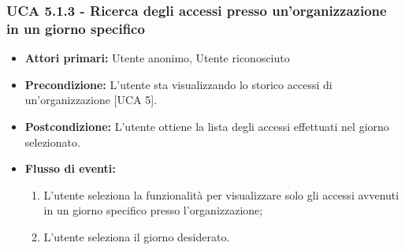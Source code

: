 \subsubsection{UCA 5.1.3 - Ricerca degli accessi presso un'organizzazione in un giorno specifico}
\begin{itemize}
	\item \textbf{Attori primari:} Utente anonimo, Utente riconosciuto
	\item \textbf{Precondizione:} L'utente sta visualizzando lo storico accessi di un'organizzazione [UCA 5].
	\item \textbf{Postcondizione:} L'utente ottiene la lista degli accessi effettuati nel giorno selezionato.
	\item \textbf{Flusso di eventi:}
	\begin{enumerate}
		\item L'utente seleziona la funzionalità per visualizzare solo gli accessi avvenuti in un giorno specifico presso l'organizzazione;
		\item L'utente seleziona il giorno desiderato.
	\end{enumerate}  
\end{itemize}

